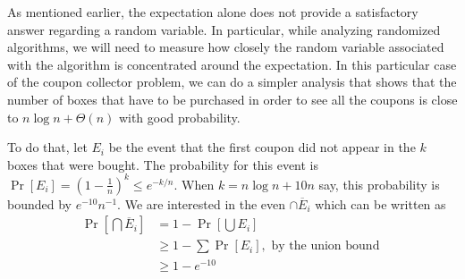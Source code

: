 As mentioned earlier, the expectation alone does not provide a satisfactory answer regarding a random variable. In particular, while analyzing randomized algorithms, we will need to measure how closely the random variable associated with the algorithm is concentrated around the expectation. In this particular case of the coupon collector problem, we can do a simpler analysis that shows that the number of boxes that have to be purchased in order to see all the coupons is close to $n\log n + \Theta(n)$ with good probability. 

To do that, let $E_i$ be the event that the first coupon did not appear in the $k$ boxes that were bought. The probability for this event is $\Pr[E_i] = \left(  1- \frac{1}{n} \right)^k\leq e^{-k/n}$. When $k=n\log n + 10n$ say, this probability is bounded by $e^{-10}n^{-1}$. We are interested in the even $\cap \overline{E}_i$ which can be written as
\begin{align*}
	\Pr\left[\bigcap \overline{E}_i \right] &= 1 - \Pr\left[ \bigcup E_i \right]\\
	&\geq 1 - \sum \Pr[E_i], \text{ by the union bound }\\
	&\geq 1 - e^{-10}
\end{align*}